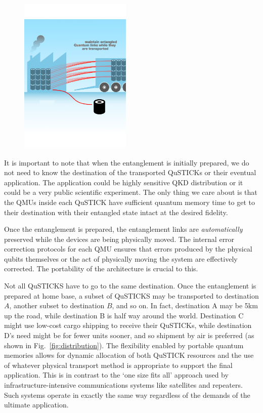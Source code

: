 \documentclass[twocolumn, aps, rmp, amsmath, amssymb, nofootinbib, superscriptaddress, longbibliography, floatfix, table-of-contents, eqsecnum]{revtex4-2}
\begin{document}
\begin{figure}[htbp!]
	\includegraphics[clip=true, width=0.475\textwidth]{qustick2}
	\caption{} \label{fig:loading}
\end{figure}

It is important to note that when the entanglement is initially prepared, we do not need to know the destination of the transported QuSTICKs or their eventual application. The application could be highly sensitive QKD distribution or it could be a very public scientific experiment. The only thing we care about is that the QMUs inside each QuSTICK have sufficient quantum memory time to get to their destination with their entangled state intact at the desired fidelity.

Once the entanglement is prepared, the entanglement links are \textit{automatically} preserved while the devices are being physically moved. The internal error correction protocols for each QMU ensures that errors produced by the physical qubits themselves or the act of physically moving the system are effectively corrected. The portability of the architecture is crucial to this. 

Not all QuSTICKS have to go to the same destination. Once the entanglement is prepared at home base, a subset of QuSTICKS may be transported to destination $A$, another subset to destination $B$, and so on. In fact, destination A may be 5km up the road, while destination B is half way around the world. Destination C might use low-cost cargo shipping to receive their QuSTICKs, while destination D's need might be for fewer units sooner, and so shipment by air is preferred (as shown in Fig.~\ref{fig:distribution}). The flexibility enabled by portable quantum memories allows for dynamic allocation of both QuSTICK resources and the use of whatever physical transport method is appropriate to support the final application. This is in contrast to the `one size fits all' approach used by infrastructure-intensive communications systems like satellites and repeaters. Such systems operate in exactly the same way regardless of the demands of the ultimate application.
\end{document}
